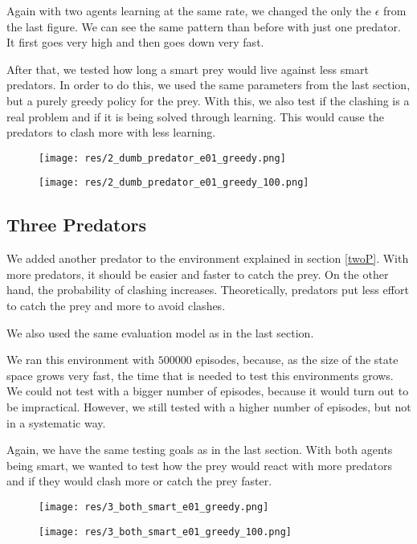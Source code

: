 \documentclass{article}
\begin{document}
Again with two agents learning at the same rate, we changed the only the
$\epsilon$ from the last figure. We can see the same pattern than before with
just one predator. It first goes very high and then goes down very fast.

After that, we tested how long a smart prey would live against less smart
predators. In order to do this, we used the same parameters from the last section, but a purely greedy policy for the prey.
With this, we also test if the clashing is a real problem and if it is being solved
through learning. This would cause the predators to clash more with less
learning. 

\begin{figure}[htbp]
	\centering
	\begin{minipage}[t]{.45\linewidth}
		\centering
		\texttt{[image: res/2\_dumb\_predator\_e01\_greedy.png]}
	\end{minipage}
	\begin{minipage}[t]{.45\linewidth}
		\centering
		\texttt{[image: res/2\_dumb\_predator\_e01\_greedy\_100.png]}
	\end{minipage}
\end{figure}



\subsection{Three Predators}
We added another predator to the environment explained in  section \ref{twoP}.
With more predators, it should be easier and faster to catch the prey. On the
other hand, the probability of clashing increases. Theoretically, predators put
less effort to catch the prey and more to avoid clashes.

We also used the same evaluation model as in the last section.

We ran this environment with $500000$ episodes, because, as the size of the state
space grows very fast, the time that is needed to test this environments grows.
We could not test with a bigger number of episodes, because it would turn out to
be impractical. However, we still tested with a higher number of episodes, but not
in a systematic way.

Again, we have the same testing goals as in the last section.  With both agents being smart, we wanted to test how the prey would react with more predators and if they would
clash more or catch the prey faster.
\begin{figure}[htbp]
	\centering
	\begin{minipage}[t]{.45\linewidth}
		\centering
		\texttt{[image: res/3\_both\_smart\_e01\_greedy.png]}
	\end{minipage}
	\begin{minipage}[t]{.45\linewidth}
		\centering
		\texttt{[image: res/3\_both\_smart\_e01\_greedy\_100.png]}
	\end{minipage}
\end{figure}
\end{document}
